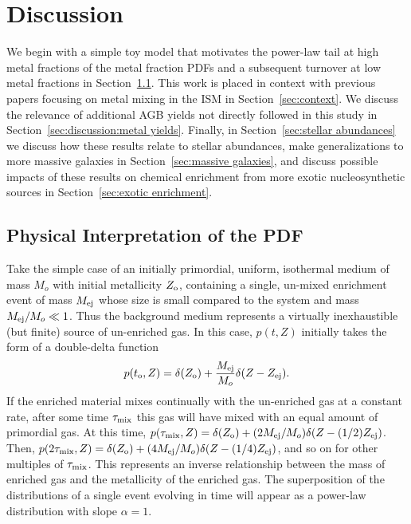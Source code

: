 \section{Discussion}
\label{sec:discussion}
We begin with a simple toy model that motivates the power-law tail at high metal fractions of the metal fraction PDFs and a subsequent turnover at low metal fractions in Section~\ref{sec:interpretation}. This work is placed in context with previous papers focusing on metal mixing in the ISM in Section~\ref{sec:context}. We discuss the relevance of additional AGB yields not directly followed in this study in Section~\ref{sec:discussion:metal yields}. Finally, in Section~\ref{sec:stellar abundances} we discuss how these results relate to stellar abundances, make generalizations to more massive galaxies in Section~\ref{sec:massive galaxies}, and discuss possible impacts of these results on chemical enrichment from more exotic nucleosynthetic sources in Section~\ref{sec:exotic enrichment}.

\subsection{Physical Interpretation of the PDF}
\label{sec:interpretation}
%
Take the simple case of an initially primordial, uniform, isothermal medium of mass $M_o$ with initial metallicity $Z_{\rm o}$, containing a single, un-mixed enrichment event of mass $M_{\rm ej}$ whose size is small compared to the system and mass $M_{\rm ej} / M_o \ll 1$. Thus the background medium represents a virtually inexhaustible (but finite) source of un-enriched gas. In this case, $p(t,Z)$ initially takes the form of a double-delta function
\begin{equation}
p(t_{\rm o},Z) = \delta(Z_{\rm o}) + \frac{M_{\rm ej}}{M_o}\delta(Z - Z_{\rm ej}).
\end{equation}
If the enriched material mixes continually with the un-enriched gas at a constant rate, after some time  $\tau_{\rm mix}$ this gas will have mixed with an equal amount of primordial gas. At this time, $p(\tau_{\rm mix},Z) = \delta(Z_{\rm o}) + (2M_{\rm ej}/M_o) \delta(Z - (1/2)Z_{\rm ej})$. Then, $p(2\tau_{\rm mix},Z) = \delta(Z_{\rm o}) + (4M_{\rm ej}/M_o)\delta(Z - (1/4) Z_{\rm ej})$, and so on for other multiples of $\tau_{\rm mix}$. This represents an inverse relationship between the mass of enriched gas and the metallicity of the enriched gas. The superposition of the distributions of a single event evolving in time will appear as a power-law distribution with slope $\alpha = 1$.

